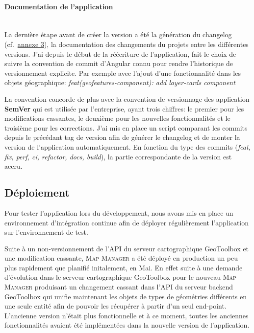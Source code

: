 \documentclass{rapportUHA40}
\begin{document}

\paragraph{Documentation de l'application}\mbox{}\\
La dernière étape avant de créer la version a été la génération du changelog
(cf.\ \hyperlink{ANNEX3}{annexe 3}), la documentation des changements du projets
entre les différentes versions. J'ai depuis le début de la réécriture de
l'application, fait le choix de suivre la convention de commit d'Angular connu
pour rendre l'historique de versionnement explicite. Par exemple avec l'ajout d'une
fonctionnalité dans les objets géographique: \textit{feat(geofeatures-component): add layer-cards component}

La convention concorde de plus avec la convention de versionnage des
application \textbf{SemVer} qui est utilisée par l'entreprise, ayant trois
chiffres: le premier pour les modifications cassantes, le deuxième pour les
nouvelles fonctionnalités et le troisième pour les corrections. J'ai mis en
place un script comparant les commits depuis le précédant tag de version afin
de générer le changelog et de monter la version de l'application
automatiquement. En fonction du type des commits (\textit{feat, fix, perf, ci,
  refactor, docs, build}), la partie correspondante de la version est accru.

\subsection{Déploiement}
Pour tester l'application lors du développement, nous avons mis en place un
environnement d'intégration continue afin de déployer régulièrement
l'application sur l'environnement de test.

Suite à un non-versionnement de l'API du serveur cartographique GeoToolbox et
une modification cassante, \textsc{Map Manager} a été déployé en production un
peu plus rapidement que planifié initalement, en Mai. En effet suite à une
demande d'évolution dans le serveur cartographique GeoToolbox pour le nouveau
\textsc{Map Manager} produisant un changement cassant dans l'API du serveur
backend GeoToolbox qui unifie maintenant les objets de types de géométries
différents en une seule entité afin de pouvoir les récupérer à partir d'un seul
end-point. L'ancienne version n'était plus fonctionnelle et à ce moment, toutes
les anciennes fonctionnalités avaient été implémentées dans la nouvelle version
de l'application.
\end{document}
